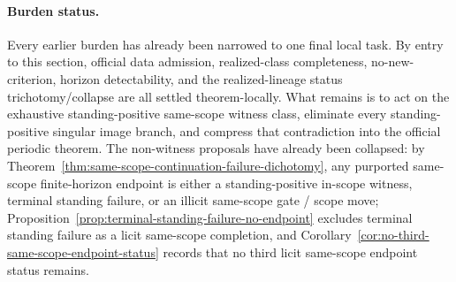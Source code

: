 \paragraph{Burden status.}
Every earlier burden has already been narrowed to one final local task. By entry to this section, official data admission, realized-class completeness, no-new-criterion, horizon detectability, and the realized-lineage status trichotomy/collapse are all settled theorem-locally. What remains is to act on the exhaustive standing-positive same-scope witness class, eliminate every standing-positive singular image branch, and compress that contradiction into the official periodic theorem. The non-witness proposals have already been collapsed: by Theorem~\ref{thm:same-scope-continuation-failure-dichotomy}, any purported same-scope finite-horizon endpoint is either a standing-positive in-scope witness, terminal standing failure, or an illicit same-scope gate / scope move; Proposition~\ref{prop:terminal-standing-failure-no-endpoint} excludes terminal standing failure as a licit same-scope completion, and Corollary~\ref{cor:no-third-same-scope-endpoint-status} records that no third licit same-scope endpoint status remains.
